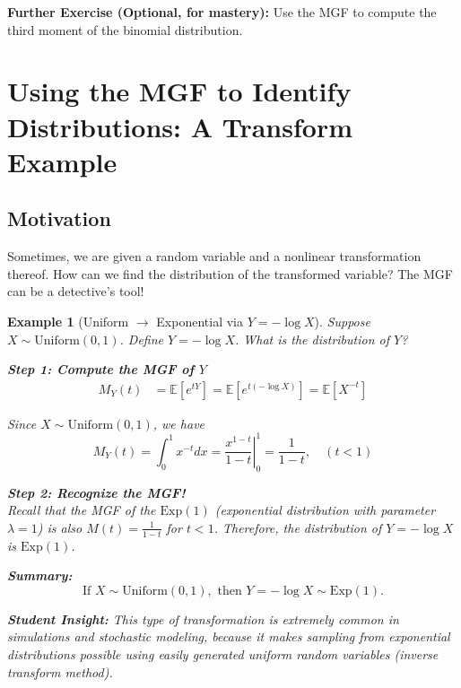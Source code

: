\documentclass[12pt]{article}
\newtheorem{example}[theorem]{Example}
\begin{document}
\vspace{1em}
\noindent\textbf{Further Exercise (Optional, for mastery):} Use the MGF to compute the third moment of the binomial distribution.

\section{Using the MGF to Identify Distributions: A Transform Example}

\subsection{Motivation}
Sometimes, we are given a random variable and a nonlinear transformation thereof. How can we find the distribution of the transformed variable? The MGF can be a detective's tool!

\begin{example}[Uniform $\to$ Exponential via $Y = -\log X$]
Suppose $X \sim \mathrm{Uniform}(0,1)$. Define $Y = -\log X$. What is the distribution of $Y$?

\textbf{Step 1: Compute the MGF of $Y$}
\begin{align*}
    M_Y(t) &= \mathbb{E}[e^{tY}] = \mathbb{E}[e^{t(-\log X)}] = \mathbb{E}[X^{-t}]
\end{align*}

Since $X \sim \mathrm{Uniform}(0,1)$, we have
\[
    M_Y(t) = \int_0^1 x^{-t} dx = \left. \frac{x^{1-t}}{1-t} \right|_{0}^1 = \frac{1}{1-t}, \quad (t < 1)
\]

\textbf{Step 2: Recognize the MGF!}\\
Recall that the MGF of the $\mathrm{Exp}(1)$ (exponential distribution with parameter $\lambda=1$) is also $M(t) = \frac{1}{1-t}$ for $t < 1$. Therefore, \emph{the distribution of $Y = -\log X$ is $\mathrm{Exp}(1)$.}

\textbf{Summary:}
\[
    \boxed{
        \text{If } X \sim \mathrm{Uniform}(0,1), \text{ then } Y = -\log X \sim \mathrm{Exp}(1).
    }
\]

\textbf{Student Insight:} This type of transformation is extremely common in simulations and stochastic modeling, because it makes sampling from exponential distributions possible using easily generated uniform random variables (inverse transform method).
\end{example}

\end{document}
